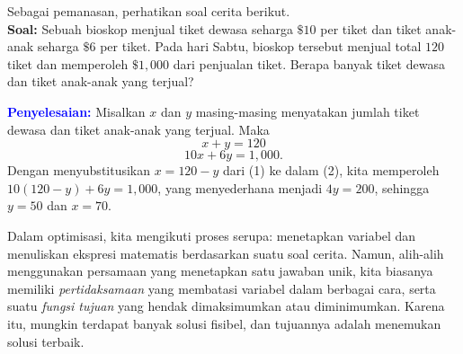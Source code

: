 Sebagai pemanasan, perhatikan soal cerita berikut.\\
\noindent \textbf{Soal:} Sebuah bioskop menjual tiket dewasa seharga $\$10$ per tiket dan tiket anak-anak seharga $\$6$ per tiket. Pada hari Sabtu, bioskop tersebut menjual total $120$ tiket dan memperoleh $\$1{,}000$ dari penjualan tiket. Berapa banyak tiket dewasa dan tiket anak-anak yang terjual?

\smallskip

\noindent \textbf{\textcolor{blue}{Penyelesaian:}} Misalkan $x$ dan $y$ masing-masing menyatakan jumlah tiket dewasa dan tiket anak-anak yang terjual. Maka
\[
x + y = 120 \tag{1}
\]
\[
10x + 6y = 1{,}000. \tag{2}
\]
Dengan menyubstitusikan $x = 120 - y$ dari (1) ke dalam (2), kita memperoleh $10(120-y) + 6y = 1{,}000$, yang menyederhana menjadi $4y = 200$, sehingga $y = 50$ dan $x = 70$.

\smallskip

Dalam optimisasi, kita mengikuti proses serupa: menetapkan variabel dan menuliskan ekspresi matematis berdasarkan suatu soal cerita. Namun, alih-alih menggunakan persamaan yang menetapkan satu jawaban unik, kita biasanya memiliki \emph{pertidaksamaan} yang membatasi variabel dalam berbagai cara, serta suatu \emph{fungsi tujuan} yang hendak dimaksimumkan atau diminimumkan. Karena itu, mungkin terdapat banyak solusi fisibel, dan tujuannya adalah menemukan solusi terbaik.

